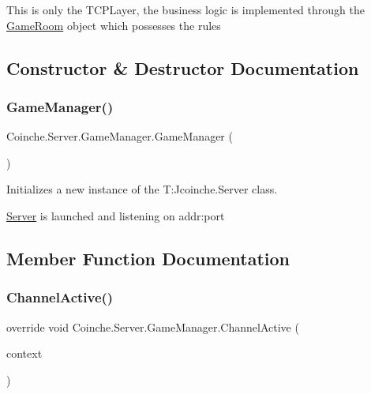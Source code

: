 This is only the T\+C\+P\+Layer, the business logic is implemented through the \hyperlink{class_coinche_1_1_server_1_1_game_room}{Game\+Room} object which possesses the rules 

\subsection{Constructor \& Destructor Documentation}
\mbox{\label{class_coinche_1_1_server_1_1_game_manager_ab9e920517c1b0486d86b0c3cdb8f2896}} 
\subsubsection{\texorpdfstring{Game\+Manager()}{GameManager()}}
{\footnotesize\ttfamily Coinche.\+Server.\+Game\+Manager.\+Game\+Manager (\begin{DoxyParamCaption}{ }\end{DoxyParamCaption})\hspace{0.3cm}{\ttfamily [inline]}}



Initializes a new instance of the T\+:\+Jcoinche.\+Server class. 

\hyperlink{namespace_coinche_1_1_server}{Server} is launched and listening on addr\+:port 

\subsection{Member Function Documentation}
\mbox{\label{class_coinche_1_1_server_1_1_game_manager_aaaa4563037a196f74811f9f35892c613}} 
\subsubsection{\texorpdfstring{Channel\+Active()}{ChannelActive()}}
{\footnotesize\ttfamily override void Coinche.\+Server.\+Game\+Manager.\+Channel\+Active (\begin{DoxyParamCaption}\item[{I\+Channel\+Handler\+Context}]{context }\end{DoxyParamCaption})\hspace{0.3cm}{\ttfamily [inline]}}



